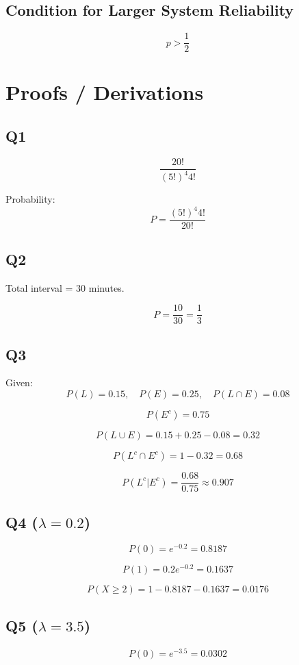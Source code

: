 \documentclass[12pt]{article}
\begin{document}
\subsection*{Condition for Larger System Reliability}
\[
p > \frac{1}{2}
\]

\section*{Proofs / Derivations}

\subsection*{Q1}

\[
\frac{20!}{(5!)^4 4!}
\]

Probability:
\[
P = \frac{(5!)^4 4!}{20!}
\]

\subsection*{Q2}

Total interval = 30 minutes.

\[
P = \frac{10}{30} = \frac{1}{3}
\]

\subsection*{Q3}

Given:
\[
P(L)=0.15, \quad P(E)=0.25, \quad P(L \cap E)=0.08
\]

\[
P(E^c)=0.75
\]

\[
P(L \cup E)=0.15+0.25-0.08=0.32
\]

\[
P(L^c \cap E^c)=1-0.32=0.68
\]

\[
P(L^c | E^c)=\frac{0.68}{0.75}\approx 0.907
\]

\subsection*{Q4 ($\lambda=0.2$)}

\[
P(0)=e^{-0.2}=0.8187
\]

\[
P(1)=0.2 e^{-0.2}=0.1637
\]

\[
P(X \ge 2)=1-0.8187-0.1637=0.0176
\]

\subsection*{Q5 ($\lambda=3.5$)}

\[
P(0)=e^{-3.5}=0.0302
\]
\end{document}
